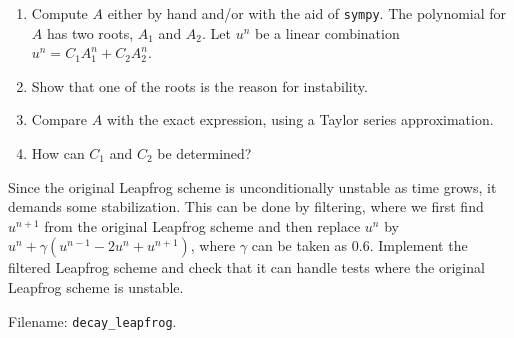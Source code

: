 \documentclass[graybox,sectrefs,envcountresetchap,open=right,final]{svmonodo}
\newenvironment{doconceexercise}{}{}
\begin{document}
\begin{doconceexercise}
\begin{enumerate}
\item Compute $A$ either by hand and/or with the aid of \texttt{sympy}.
   The polynomial for $A$ has two roots, $A_1$ and $A_2$. Let
   $u^n$ be a linear combination $u^n=C_1A_1^n + C_2A_2^n$.

\item Show that one of the roots is the reason for instability.

\item Compare $A$ with the exact expression, using a Taylor series approximation.

\item How can $C_1$ and $C_2$ be determined?
\end{enumerate}

\noindent
{}
Since the original Leapfrog scheme is unconditionally unstable as time
grows, it demands some stabilization.  This can be done by filtering,
where we first find $u^{n+1}$ from the original Leapfrog scheme and
then replace $u^{n}$ by $u^n + \gamma (u^{n-1} - 2u^n +
u^{n+1})$, where $\gamma$ can be taken as 0.6.  Implement the filtered
Leapfrog scheme and check that it can handle tests where the original
Leapfrog scheme is unstable.


\noindent Filename: \Verb!decay_leapfrog!.

\end{doconceexercise}
\end{document}
